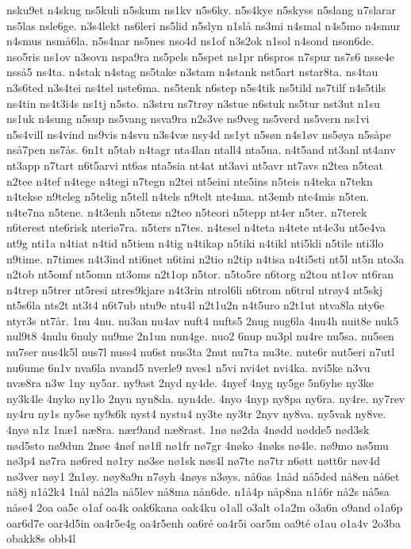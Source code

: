 {nsku9et
n4skug
ns5kuli
n5skum
ns1kv
n5s6ky.
n5s4kye
n5skyss
n5slang
n7slarar
ns5las
nsle6ge.
n3s4lekt
ns6leri
ns5lid
n5slyn
n1slå
ns3mi
n4smal
n4s5mo
n4smur
n4smus
nsmå6la.
n5s4nar
ns5nes
nso4d
ns1of
n3s2ok
n1sol
n4sond
nson6de.
nso5ris
ns1ov
n3sovn
nspa9ra
ns5pels
n5spet
ns1pr
n6spros
n7spur
ns7s6
nsse4e
nsså5
ns4ta.
n4stak
n4stag
ns5take
n3stam
n4stank
nst5art
nstar8ta.
ns4tau
n3s6ted
n3s4tei
ns4tel
nste6ma.
ns5tenk
n6step
n5s4tik
ns5tild
ns7tilf
n4s5tils
ns4tin
ns4t3i4s
ns1tj
n5sto.
n3stru
ns7trøy
n3stue
n6stuk
ns5tur
nst3ut
n1su
ns1uk
n4sung
n5sup
ns5vang
nsva9ra
n2s3ve
ns9veg
ns5verd
ns5vern
ns1vi
n5s4vill
ns4vind
ns9vis
n4svu
n3s4væ
nsy4d
ns1yt
n5søn
n4s1øv
ns5øya
n5såpe
nså7pen
ns7ås.
6n1t
n5tab
n4tagr
nta4lan
ntall4
nta5na.
n4t5and
nt3anl
nt4anv
nt3app
n7tart
n6t5arvi
nt6as
nta5sia
nt4at
nt3avi
nt5avr
nt7avs
n2tea
n5teat
n2tee
n4tef
n4tege
n4tegi
n7tegn
n2tei
nt5eini
nte5ins
n5teis
n4teka
n7tekn
n4tekse
n9teleg
n5telig
n5tell
n4tels
n9telt
nte4ma.
nt3emb
nte4mis
n5ten.
n4te7na
n5tene.
n4t3enh
n5tens
n2teo
n5teori
n5tepp
nt4er
n5ter.
n7terek
n6terest
nte6risk
nteriø7ra.
n5ters
n7tes.
n4tesel
n4teta
n4tete
nt4e3u
nt5e4va
nt9g
nti1a
n4tiat
n4tid
n5tiem
n4tig
n4tikap
n5tiki
n4tikl
nti5kli
n5tile
nti3lo
n9time.
n7times
n4t3ind
nti6net
n6tini
n2tio
n2tip
n4tisa
n4ti5sti
nt5l
nt5n
nto3a
n2tob
nt5omf
nt5omn
nt3oms
n2t1op
n5tor.
n5to5re
n6torg
n2tou
nt1ov
nt6ran
n4trep
n5trer
nt5resi
ntres9kjare
n4t3rin
ntrol6li
n6trom
n6trul
ntrøy4
nt5skj
nt5s6la
nts2t
nt3t4
n6t7ub
ntu9e
ntu4l
n2t1u2n
n4t5uro
n2t1ut
ntva8la
nty6e
ntyr3s
nt7år.
1nu
4nu.
nu3an
nu4av
nuft4
nufts5
2nug
nug6la
4nu4h
nuit8e
nuk5
nul9t8
4nulu
6nuly
nu9me
2n1un
nun4ge.
nuo2
6nup
nu3pl
nu4re
nu5sa.
nu5sen
nu7ser
nus4k5l
nus7l
nuss4
nu6st
nus3ta
2nut
nu7ta
nu3te.
nute6r
nut5eri
n7utl
nu6ume
6n1v
nva6la
nvand5
nverle9
nves1
n5vi
nvi4et
nvi4ka.
nvi5ke
n3vu
nvæ8ra
n3w
1ny
ny5ar.
ny9ast
2nyd
ny4de.
4nyef
4nyg
ny5ge
5n6yhe
ny3ke
ny3k4le
4nyko
ny1lo
2nyn
nyn8da.
nyn4de.
4nyo
4nyp
ny8pa
ny6ra.
ny4re.
ny7rev
ny4ru
ny1s
ny5se
ny9s6k
nyst4
nystu4
ny3te
ny3tr
2nyv
ny8va.
ny5vak
ny8ve.
4nyø
n1z
1næ1
næ8ra.
nær9and
næ8rast.
1nø
nø2da
4nødd
nødde5
nød3sk
nød5sto
nø9dun
2nøe
4nøf
nø1fl
nø1fr
nø7gr
4nøko
4nøks
nø4le.
nø9mo
nø5mu
nø3p4
nø7ra
nø6red
nø1ry
nø3se
nø1sk
nøs4l
nø7te
nø7tr
n6øtt
nøtt6r
nøv4d
nø3ver
nøy1
2n1øy.
nøy8a9n
n7øyh
4nøys
n3øys.
nå6as
1nåd
nå5ded
nå8en
nå6et
nå8j
n1å2k4
1nål
nå2la
nå5lev
nå8ma
nån6de.
n1å4p
nåp8na
n1å6r
nå2s
nå5sa
nåse4
2oa
oa5c
o1af
oa4k
oak6kana
oak4ku
o1all
o3alt
o1a2m
o3a6n
o9and
o1a6p
oar6d7e
oar4d5in
oa4r5e4g
oa4r5enh
oa6ré
oa4r5i
oar5m
oa9té
o1au
o1a4v
2o3ba
obakk8s
obb4l
}
